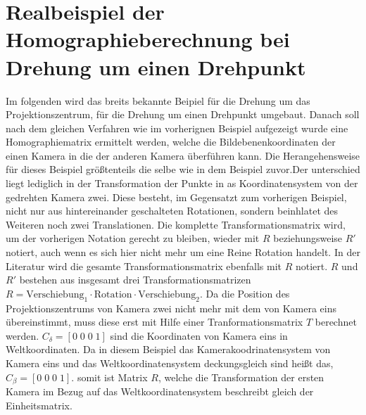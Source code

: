 \section{Realbeispiel der Homographieberechnung bei Drehung um einen Drehpunkt}
\label{sec:AppendixHomographieRotationDP}



Im folgenden wird das breits bekannte Beipiel für die Drehung um das Projektionszentrum, für die Drehung um einen Drehpunkt umgebaut. Danach soll nach dem gleichen Verfahren wie im vorherignen Beispiel aufgezeigt wurde eine Homographiematrix ermittelt werden, welche die Bildebenenkoordinaten der einen Kamera in die der anderen Kamera überführen kann. Die Herangehensweise für  dieses Beispiel größtenteils die selbe wie in dem Beispiel zuvor.Der unterschied liegt lediglich in der Transformation der Punkte in as Koordinatensystem von der gedrehten Kamera zwei. Diese besteht, im Gegensatzt zum vorherigen Beispiel, nicht nur aus hintereinander geschalteten Rotationen, sondern beinhlatet des Weiteren noch zwei Translationen. Die komplette Transformationsmatrix wird, um der vorherigen Notation gerecht zu bleiben, wieder mit $R$ beziehungsweise $R'$ notiert, auch wenn es sich hier nicht mehr um eine Reine Rotation handelt. In der Literatur wird die gesamte Transformationsmatrix ebenfalls mit $R$ notiert\cite{HZ,Elements,Schwarz}. $R$ und $R'$ bestehen aus insgesamt drei Transformationsmatrizen \ensuremath{R = \text{Verschiebung}_1 \cdot \text{Rotation} \cdot \text{Verschiebung}_2}. Da die Position des Projektionszentrums von Kamera zwei nicht mehr mit dem von Kamera eins übereinstimmt, muss diese erst mit Hilfe einer Tranformationsmatrix $T$ berechnet werden. $C_{\delta} = [0 \;0 \;0\; 1]$ sind die Koordinaten von Kamera eins in Weltkoordinaten. Da in diesem Beispiel das Kamerakoodrinatensystem von Kamera eins und das Weltkoordinatensystem deckungsgleich sind heißt das,  $C_{\beta} = [0 \;0 \;0\; 1]$. somit ist Matrix $R$, welche die Transformation der ersten Kamera im Bezug auf das Weltkoordinatensystem beschreibt gleich der Einheitsmatrix.

